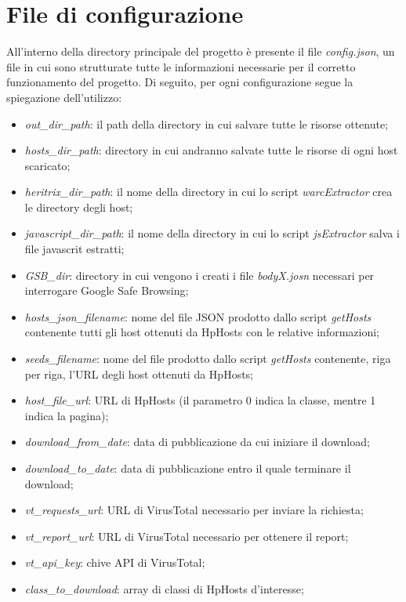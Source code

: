 \documentclass[a4paper, 11pt, oneside]{report}
\begin{document}
\section{File di configurazione} \label{sec:configFile}
All'interno della directory principale del progetto è presente il file \textit{config.json}, un file in cui sono strutturate tutte le informazioni necessarie per il corretto funzionamento del progetto. Di seguito, per ogni configurazione segue la spiegazione dell'utilizzo:
\begin{itemize}
	\item{\textit{out\_dir\_path}}: il path della directory in cui salvare tutte le risorse ottenute;
	\item{\textit{hosts\_dir\_path}}: directory in cui andranno salvate tutte le risorse di ogni host scaricato;
	\item{\textit{heritrix\_dir\_path}}: il nome della directory in cui lo script \textit{warcExtractor} crea le directory degli host;
	\item{\textit{javascript\_dir\_path}}: il nome della directory in cui lo script \textit{jsExtractor} salva i file javascrit estratti;
	\item{\textit{GSB\_dir}}: directory in cui vengono i creati i file \textit{bodyX.josn} necessari per interrogare Google Safe Browsing;
	\item{\textit{hosts\_json\_filename}}: nome del file JSON prodotto dallo script \textit{getHosts} contenente tutti gli host ottenuti da HpHosts con le relative informazioni;
	\item{\textit{seeds\_filename}}: nome del file prodotto dallo script  \textit{getHosts} contenente, riga per riga, l'URL degli host ottenuti da HpHosts;
	\item{\textit{host\_file\_url}}: URL di HpHosts (il parametro 0 indica la classe, mentre 1 indica la pagina);
	\item{\textit{download\_from\_date}}: data di pubblicazione da cui iniziare il download;
	\item{\textit{download\_to\_date}}: data di pubblicazione entro il quale terminare il download;
	\item{\textit{vt\_requests\_url}}: URL di VirusTotal necessario per inviare la richiesta;
	\item{\textit{vt\_report\_url}}: URL di VirusTotal necessario per ottenere il report;
	\item{\textit{vt\_api\_key}}: chive API di VirusTotal;
	\item{\textit{class\_to\_download}}: array di classi di HpHosts d'interesse;

\end{itemize}
\end{document}
